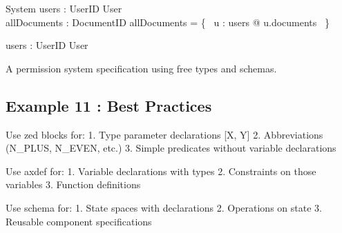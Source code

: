\documentclass[a4paper,10pt,fleqn]{article}
\begin{document}
\begin{schema}{System}
users : UserID \pfun User \\
allDocuments : \finset DocumentID
\where
allDocuments = \bigcup \{~ u : \ran users @ u.documents ~\}
\end{schema}

\begin{axdef}
users : UserID \pfun User
\end{axdef}

\noindent A permission system specification using free types and schemas.

\bigskip

\subsection*{Example 11 : Best Practices}

\noindent Use zed blocks for: 1. Type parameter declarations [X, Y] 2. Abbreviations (N\_PLUS, N\_EVEN, etc.) 3. Simple predicates without variable declarations

\bigskip

\noindent Use axdef for: 1. Variable declarations with types 2. Constraints on those variables 3. Function definitions

\bigskip

\noindent Use schema for: 1. State spaces with declarations 2. Operations on state 3. Reusable component specifications

\bigskip
\end{document}
